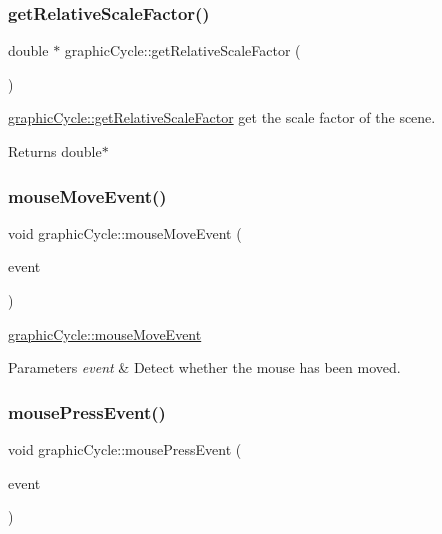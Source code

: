 \subsubsection{\texorpdfstring{get\+Relative\+Scale\+Factor()}{getRelativeScaleFactor()}}
{\footnotesize\ttfamily double $\ast$ graphic\+Cycle\+::get\+Relative\+Scale\+Factor (\begin{DoxyParamCaption}{ }\end{DoxyParamCaption})}



\mbox{\hyperlink{classgraphic_cycle_a80b533c2477a08f98506202d94bad7bc}{graphic\+Cycle\+::get\+Relative\+Scale\+Factor}} get the scale factor of the scene. 

\begin{DoxyReturn}{Returns}
double$\ast$ 
\end{DoxyReturn}
\mbox{\label{classgraphic_cycle_aec6514c9578de68150bf2eea9b4e80c4}} 
\subsubsection{\texorpdfstring{mouse\+Move\+Event()}{mouseMoveEvent()}}
{\footnotesize\ttfamily void graphic\+Cycle\+::mouse\+Move\+Event (\begin{DoxyParamCaption}\item[{Q\+Graphics\+Scene\+Mouse\+Event $\ast$}]{event }\end{DoxyParamCaption})}



\mbox{\hyperlink{classgraphic_cycle_aec6514c9578de68150bf2eea9b4e80c4}{graphic\+Cycle\+::mouse\+Move\+Event}} 


\begin{DoxyParams}{Parameters}
{\em event} & Detect whether the mouse has been moved. \\
\hline
\end{DoxyParams}
\mbox{\label{classgraphic_cycle_af731c349d665b784291187ad4b0a71d9}} 
\subsubsection{\texorpdfstring{mouse\+Press\+Event()}{mousePressEvent()}}
{\footnotesize\ttfamily void graphic\+Cycle\+::mouse\+Press\+Event (\begin{DoxyParamCaption}\item[{Q\+Graphics\+Scene\+Mouse\+Event $\ast$}]{event }\end{DoxyParamCaption})}



